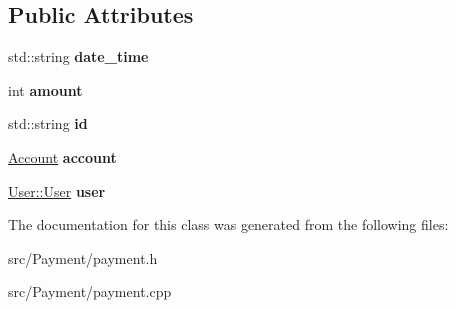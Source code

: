 \subsection*{Public Attributes}
\begin{DoxyCompactItemize}
\item 
\hypertarget{classPayment_aa902a90d3e2c6d0aba974738e015d810}{std\-::string {\bfseries date\-\_\-time}}\label{classPayment_aa902a90d3e2c6d0aba974738e015d810}

\item 
\hypertarget{classPayment_a6386cb08a31b3d4a9c9f3317a177502f}{int {\bfseries amount}}\label{classPayment_a6386cb08a31b3d4a9c9f3317a177502f}

\item 
\hypertarget{classPayment_afbfda92c58e679ff3613a2dc0f5e8d6e}{std\-::string {\bfseries id}}\label{classPayment_afbfda92c58e679ff3613a2dc0f5e8d6e}

\item 
\hypertarget{classPayment_a3cfe900556f61fdb630c9d0de54218c0}{\hyperlink{classAccount}{Account} {\bfseries account}}\label{classPayment_a3cfe900556f61fdb630c9d0de54218c0}

\item 
\hypertarget{classPayment_acf3f61dabeac253cd6a67a4c9e5c4832}{\hyperlink{classUser_1_1User}{User\-::\-User} {\bfseries user}}\label{classPayment_acf3f61dabeac253cd6a67a4c9e5c4832}

\end{DoxyCompactItemize}


The documentation for this class was generated from the following files\-:\begin{DoxyCompactItemize}
\item 
src/\-Payment/payment.\-h\item 
src/\-Payment/payment.\-cpp\end{DoxyCompactItemize}
